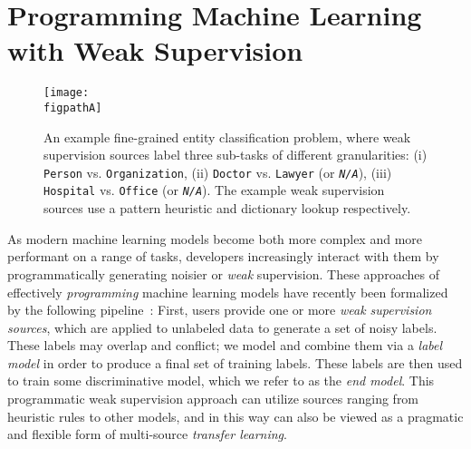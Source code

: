 \documentclass[letterpaper]{article}
\begin{document}
\section{Programming Machine Learning with Weak Supervision}
\label{sec:setup}


\begin{figure}
	\centering
	\texttt{[image: \\figpathA]}
	\caption{
		An example fine-grained entity classification problem, where weak supervision sources label three sub-tasks of different granularities: (i) \texttt{Person} vs. \texttt{Organization}, (ii) \texttt{Doctor} vs. \texttt{Lawyer} (or \textit{\texttt{N/A}}), (iii) \texttt{Hospital} vs. \texttt{Office} (or \textit{\texttt{N/A}}).
		The example weak supervision sources use a pattern heuristic and dictionary lookup respectively.
	}
	\label{fig:lf_example}
\end{figure}

As modern machine learning models become both more complex and more performant on a range of tasks, developers increasingly interact with them by programmatically generating noisier or \textit{weak} supervision.
These approaches of effectively \textit{programming} machine learning models have recently been formalized by the following pipeline~\cite{ratner2016data,ratner2018snorkel}:
First, users provide one or more \textit{weak supervision sources}, which are applied to unlabeled data to generate a set of noisy labels.
These labels may overlap and conflict; we model and combine them via a \textit{label model} in order to produce a final set of training labels.
These labels are then used to train some discriminative model, which we refer to as the \textit{end model}.
This programmatic weak supervision approach can utilize sources ranging from heuristic rules to other models, and in this way can also be viewed as a pragmatic and flexible form of multi-source \textit{transfer learning}.
\end{document}
